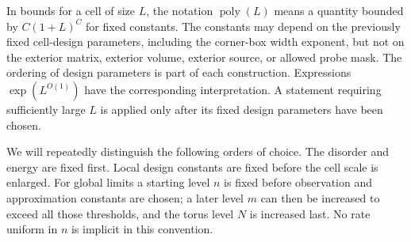 In bounds for a cell of size $L$, the notation $\operatorname{poly}(L)$
means a quantity bounded by $C(1+L)^C$ for fixed constants. The constants
may depend on the previously fixed cell-design parameters, including
the corner-box width exponent, but not on the exterior matrix, exterior
volume, exterior source, or allowed probe mask. The ordering of design
parameters is part of each construction. Expressions
$\exp(L^{O(1)})$ have the corresponding interpretation. A statement
requiring sufficiently large $L$ is applied only after its fixed design
parameters have been chosen.

We will repeatedly distinguish the following orders of choice. The
disorder and energy are fixed first. Local design constants are fixed
before the cell scale is enlarged. For global limits a starting level
$n$ is fixed before observation and approximation constants are chosen;
a later level $m$ can then be increased to exceed all those thresholds,
and the torus level $N$ is increased last. No rate uniform in $n$ is
implicit in this convention.
